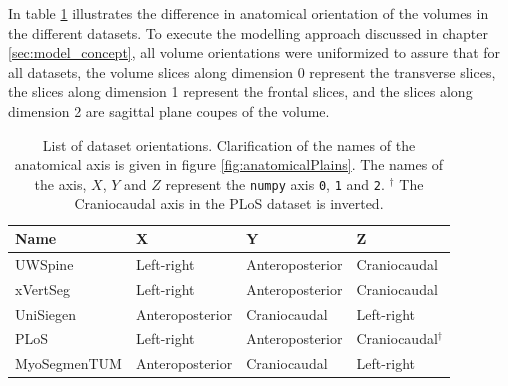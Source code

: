 In table \ref{tab:dataOrientation} illustrates the difference in anatomical orientation of the volumes in the different datasets.
To execute the modelling approach discussed in chapter \ref{sec:model_concept}, all volume orientations were uniformized to assure that for all datasets, the volume slices along dimension 0 represent the transverse slices, 
the slices along dimension 1 represent the frontal slices, and the slices along dimension 2 are sagittal plane coupes of the volume.

\begin{table}
 
    \begin{tabular}{ l l l l} 
     \toprule
     Name & X & Y & Z \\
     \hline 
    UWSpine & Left-right & Anteroposterior & Craniocaudal \\
    xVertSeg & Left-right & Anteroposterior & Craniocaudal \\
    UniSiegen  &  Anteroposterior & Craniocaudal & Left-right \\
    PLoS & Left-right & Anteroposterior & Craniocaudal$^\dagger$ \\
    MyoSegmenTUM &  Anteroposterior & Craniocaudal & Left-right \\
     \bottomrule
    \end{tabular}
    \caption{List of dataset orientations. Clarification of the names of the anatomical axis is given in figure \ref{fig:anatomicalPlains}.
    The names of the axis, $X$, $Y$ and $Z$ represent the \texttt{numpy} axis \texttt{0}, \texttt{1} and \texttt{2}.
    $^\dagger$ The Craniocaudal axis in the PLoS dataset is inverted.\label{tab:dataOrientation}
    }
\end{table}

